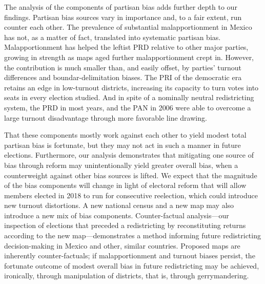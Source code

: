 \documentclass[letter,12pt]{article}
\begin{document}
The analysis of the components of partisan bias adds further depth to our findings. Partisan bias sources vary in importance and, to a fair extent, run counter each other. The prevalence of substantial malapportionment in Mexico has not, as a matter of fact, translated into systematic partisan bias. Malapportionment has helped the leftist PRD relative to other major parties, growing in strength as maps aged further malapportionment crept in. However, the contribution is much smaller than, and easily offset, by parties' turnout differences and boundar-delimitation biases. The PRI of the democratic era retains an edge in low-turnout districts, increasing its capacity to turn votes into seats in every election studied. And in spite of a nominally neutral redistricting system, the PRD in most years, and the PAN in 2006 were able to overcome a large turnout disadvantage through more favorable line drawing. 

That these components mostly work against each other to yield modest total partisan bias is fortunate, but they may not act in such a manner in future elections. Furthermore, our analysis demonstrates that mitigating one source of bias through reform may unintentionally yield greater overall bias, when a counterweight against other bias sources is lifted. We expect that the magnitude of the bias components will change in light of electoral reform that will allow members elected in 2018 to run for consecutive reelection, which could introduce new turnout distortions. A new national census and a new map may also introduce a new mix of bias components. Counter-factual analysis---our inspection of elections that preceded a redistricting by reconstituting returns according to the new map---demonstrates a method informing future redistricting decision-making in Mexico and other, similar countries. Proposed maps are inherently counter-factuals; if malapportionment and turnout biases persist, the fortunate outcome of modest overall bias in future redistricting may be achieved, ironically, through manipulation of districts, that is, through gerrymandering.


\end{document}
